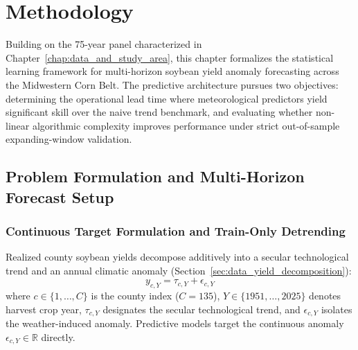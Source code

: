 \chapter{Methodology}
\label{chap:methodology}

Building on the 75-year panel characterized in Chapter~\ref{chap:data_and_study_area}, this chapter formalizes the statistical learning framework for multi-horizon soybean yield anomaly forecasting across the Midwestern Corn Belt. The predictive architecture pursues two objectives: determining the operational lead time where meteorological predictors yield significant skill over the naive trend benchmark, and evaluating whether non-linear algorithmic complexity improves performance under strict out-of-sample expanding-window validation.


\section{Problem Formulation and Multi-Horizon Forecast Setup}
\label{sec:meth_problem_setup}

\subsection{Continuous Target Formulation and Train-Only Detrending}
\label{sec:meth_target_formulation}

Realized county soybean yields decompose additively into a secular technological trend and an annual climatic anomaly (Section~\ref{sec:data_yield_decomposition}):
\begin{equation}
    y_{c,Y} = \tau_{c,Y} + \epsilon_{c,Y}
    \label{eq:yield_additive_decomp}
\end{equation}
where $c \in \{1, \dots, C\}$ is the county index ($C = 135$), $Y \in \{1951, \dots, 2025\}$ denotes harvest crop year, $\tau_{c,Y}$ designates the secular technological trend, and $\epsilon_{c,Y}$ isolates the weather-induced anomaly. Predictive models target the continuous anomaly $\epsilon_{c,Y} \in \mathbb{R}$ directly.

